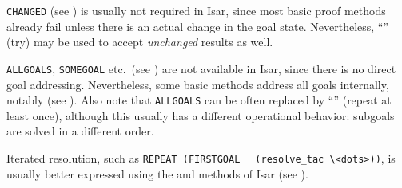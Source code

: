 \begin{isabellebody}
\begin{isamarkuptext}
  \medskip \verb|CHANGED| (see \cite{isabelle-implementation}) is
  usually not required in Isar, since most basic proof methods already
  fail unless there is an actual change in the goal state.
  Nevertheless, ``''  (try) may be used to accept
  \emph{unchanged} results as well.

  \medskip \verb|ALLGOALS|, \verb|SOMEGOAL| etc.\ (see
  \cite{isabelle-implementation}) are not available in Isar, since
  there is no direct goal addressing.  Nevertheless, some basic
  methods address all goals internally, notably \hyperlink{method.simp-all}{\mbox{}}
  (see ).  Also note that \verb|ALLGOALS| can be
  often replaced by ``'' (repeat at least once), although
  this usually has a different operational behavior: subgoals are
  solved in a different order.

  \medskip Iterated resolution, such as \verb|REPEAT (FIRSTGOAL|\isasep\isanewline%
\verb|  (resolve_tac \<dots>))|, is usually better expressed using the \hyperlink{method.intro}{\mbox{}} and \hyperlink{method.elim}{\mbox{}} methods of Isar (see
  ).%
\end{isamarkuptext}%
\isamarkuptrue%
%
\isadelimtheory
%
\endisadelimtheory
%
\isatagtheory
{}\isamarkupfalse%
%
\endisatagtheory
{\isafoldtheory}%
%
\isadelimtheory
%
\endisadelimtheory
\isanewline
\end{isabellebody}%
